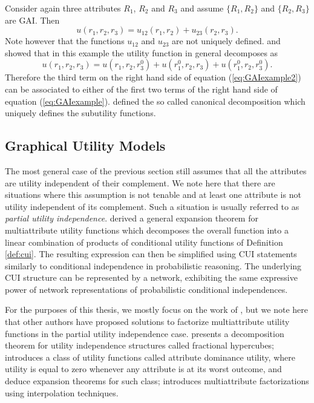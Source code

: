 \begin{example}
Consider again three attributes $R_1$, $R_2$ and $R_3$ and assume $\{R_1,R_2\}$ and $\{R_2,R_3\}$ are \gls{GAI}. Then
\begin{equation}
\label{eq:GAIexample}
u(r_1,r_2,r_3)=u_{12}(r_1,r_2)+u_{23}(r_2,r_3).
\end{equation} 
Note however that the functions  $u_{12}$ and $u_{23}$ are not uniquely defined. \citet{Braziunas2005} and \citet{fishburn} showed that in this example the utility function in general decomposes as
\begin{equation}
\label{eq:GAIexample2}
u(r_1,r_2,r_3)=u(r_1,r_2,r_3^0)+u(r_1^0,r_2,r_3)+u(r_1^0,r_2,r_3^0).
\end{equation}
Therefore the third term on the right hand side of equation (\ref{eq:GAIexample2}) can be associated to either of the first two terms of the right hand side of equation (\ref{eq:GAIexample}). \citet{fishburn} defined the so called canonical decomposition which uniquely defines the subutility functions.
\end{example}

\subsection{Graphical Utility Models}
The most general case of the previous section still assumes that all the attributes are utility independent of their complement. We note here that there are situations where this assumption is not tenable and at least one attribute is not utility independent of its complement. Such a situation is usually referred to as \textit{partial utility independence}. \citet{Abbas2010} derived a general expansion theorem for multiattribute utility functions which decomposes the overall function into a linear combination of products of conditional utility functions of Definition \ref{def:cui}. The resulting expression can then be simplified using \gls{CUI} statements similarly to conditional independence in probabilistic reasoning. The underlying \gls{CUI} structure can be represented by a network, exhibiting the same expressive power of network representations of probabilistic conditional independences. 

For the purposes of this thesis, we mostly focus on the work of \citet{Abbas2010}, but we note here that other authors have proposed solutions to factorize multiattribute utility functions in the partial utility independence case. \citet{Farquhar1975} presents a decomposition theorem for utility independence structures called fractional hypercubes; \citet{Abbas2005} introduces a class of utility functions called attribute dominance utility, where utility is equal to zero whenever any attribute is at its worst outcome, and deduce expansion theorems for such class; \citet{Bell1979} introduces multiattribute factorizations using interpolation techniques. 

